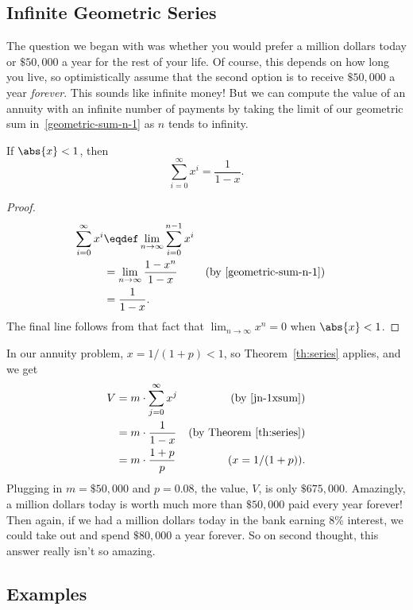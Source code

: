 \subsection{Infinite Geometric Series}

The question we began with was whether you would prefer a million dollars
today or $\$50,000$ a year for the rest of your life.  Of course, this
depends on how long you live, so optimistically assume that the second
option is to receive $\$50,000$ a year \emph{forever}.  This sounds like
infinite money!  But we can compute the value of an annuity with an
infinite number of payments by taking the limit of our geometric sum
in~\eqref{geometric-sum-n-1} as $n$ tends to infinity.
\begin{theorem}\label{th:series}
If $\abs{x} < 1$, then
\[
\sum_{i=0}^\infty x^i = \frac{1}{1-x}.
\]
\end{theorem}

\begin{proof}
\begin{align*}
\sum_{i=0}^\infty x^i
   & \eqdef  \lim_{n \rightarrow \infty} \sum_{i=0}^{n-1} x^i \\
   & = \lim_{n \rightarrow \infty} \frac{1 - x^n}{1-x}
        & & \text{(by~\eqref{geometric-sum-n-1})}\\
   & = \frac{1}{1-x}.
\end{align*}
The final line follows from that fact that $\lim_{n \rightarrow \infty}
x^n =0$ when $\abs{x} < 1$.
\end{proof}

In our annuity problem, $x=1/(1+p) < 1$, so Theorem~\ref{th:series}
applies, and we get
\begin{align*}
V & = m \cdot \sum_{j=0}^{\infty} x^j & \text{(by \eqref{jn-1xsum})}\\
  &= m\cdot \frac{1}{1-x} & \text{(by Theorem~\ref{th:series})}\\
  &= m\cdot \frac{1 + p}{p} &(x = 1/(1+p)).
\end{align*}
Plugging in $m = \$50,000$ and $p = 0.08$, the value, $V$, is only
$\$675,000$.  Amazingly, a million dollars today is worth much more than
$\$50,000$ paid every year forever!  Then again, if we had a million
dollars today in the bank earning 8\% interest, we could take out and
spend $\$80,000$ a year forever.  So on second thought, this answer really
isn't so amazing.

\subsection*{Examples}

